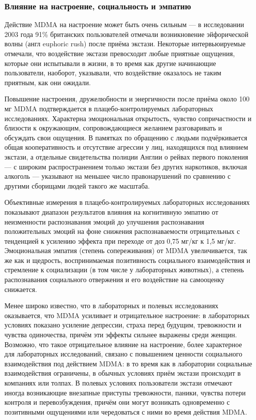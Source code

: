 \documentclass[a4paper,14pt,russian]{report}
\begin{document}
\subsubsection{Влияние на настроение, социальность и эмпатию}

Действие MDMA на настроение может быть очень сильным — в исследовании 2003 года 91\% британских пользователей отмечали возникновение эйфорической волны (англ euphoric rush) после приёма экстази. Некоторые интервьюируемые отмечали, что воздействие экстази превосходит любые приятные ощущения, которые они испытывали в жизни, в то время как другие начинающие пользователи, наоборот, указывали, что воздействие оказалось не таким приятным, как они ожидали.

Повышение настроения, дружелюбности и энергичности после приёма около 100 мг MDMA подтверждается в плацебо-контролируемых лабораторных исследованиях. Характерна эмоциональная открытость, чувство сопричастности и близости к окружающим, сопровождающиеся желанием разговаривать и обсуждать свои ощущения. В памятках по обращению с людьми подчёркивается общая кооперативность и отсутствие агрессии у лиц, находящихся под влиянием экстази, а отдельные свидетельства полиции Англии о рейвах первого поколения — с широким распространением только экстази без других наркотиков, включая алкоголь — указывают на меньшее число правонарушений по сравнению с другими сборищами людей такого же масштаба.

Объективные измерения в плацебо-контролируемых лабораторных исследованиях показывают диапазон результатов влияния на когнитивную эмпатию от неизменности распознавания эмоций до улучшения распознавания положительных эмоций на фоне снижения распознаваемости отрицательных с тенденцией к усилению эффекта при переходе от доз 0,75 мг/кг к 1,5 мг/кг. Эмоциональная эмпатия (степень сопереживания) от MDMA увеличивается, так же как и щедрость, воспринимаемая позитивность социального взаимодействия и стремление к социализации (в том числе у лабораторных животных), а степень распознавания социального отвержения и его воздействие на самооценку снижается.

Менее широко известно, что в лабораторных и полевых исследованиях оказывается, что MDMA усиливает и отрицательное настроение: в лабораторных условиях показано усиление депрессии, страха перед будущим, тревожности и чувства одиночества, причём эти эффекты сильнее выражены среди женщин. Возможно, что такое отрицательное влияние на настроение, более характерное для лабораторных исследований, связано с повышением ценности социального взаимодействия под действием MDMA: в то время как в лаборатории социальные взаимодействия ограничены, в обычных условиях приём экстази происходит в компаниях или толпах. В полевых условиях пользователи экстази отмечают иногда возникающие внезапные приступы тревожности, паники, чувства потери контроля и перевозбуждения, причём они могут возникать одновременно с позитивными ощущениями или чередоваться с ними во время действия MDMA.
\end{document}
